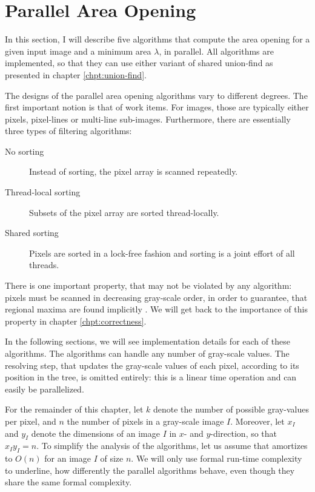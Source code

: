 \chapter{Parallel Area Opening}
\label{chpt:area-opening}

In this section, I will describe five algorithms that compute the area opening
for a given input image and a minimum area $\lambda$, in parallel. All
algorithms are implemented, so that they can use either variant of shared
union-find as presented in chapter \ref{chpt:union-find}.

The designs of the parallel area opening algorithms vary to different
degrees. The first important notion is that of work items. For images, those are
typically either pixels, pixel-lines or multi-line sub-images. Furthermore,
there are essentially three types of filtering algorithms:

\begin{description}
\item[No sorting] Instead of sorting, the pixel array is scanned repeatedly.

\item[Thread-local sorting] Subsets of the pixel array are sorted
  thread-locally.

\item[Shared sorting] Pixels are sorted in a lock-free fashion and sorting is a
  joint effort of all threads.

\end{description}

There is one important property, that may not be violated by any algorithm:
pixels must be scanned in decreasing gray-scale order, in order to guarantee,
that regional maxima are found implicitly \cite{Meijster2002Comparison}. We will
get back to the importance of this property in chapter \ref{chpt:correctness}.

In the following sections, we will see implementation details for each of these
algorithms. The algorithms can handle any number of gray-scale values. The
resolving step, that updates the gray-scale values of each pixel, according to
its position in the tree, is omitted entirely: this is a linear time operation
\cite{Meijster2002Comparison} and can easily be parallelized.

For the remainder of this chapter, let $k$ denote the number of possible
gray-values per pixel, and $n$ the number of pixels in a gray-scale image
$I$. Moreover, let $x_I$ and $y_I$ denote the dimensions of an image $I$ in $x$-
and $y$-direction, so that $x_I y_I = n$. To simplify the analysis of the
algorithms, let us assume that  amortizes to $O(n)$
for an image $I$ of size $n$. We will only use formal run-time complexity to
underline, how differently the parallel algorithms behave, even though they
share the same formal complexity.

